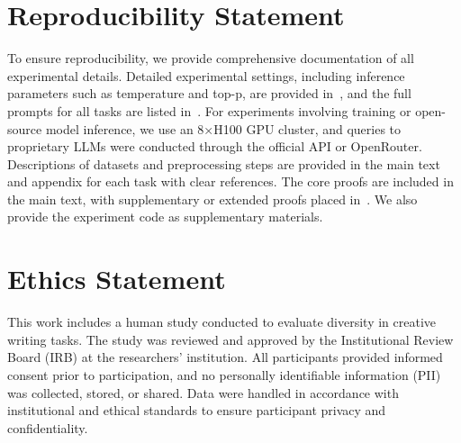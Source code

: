 
\newpage
\section*{Reproducibility Statement}
To ensure reproducibility, we provide comprehensive documentation of all experimental details.
Detailed experimental settings, including inference parameters such as temperature and top-p, are provided in~, and the full prompts for all tasks are listed in~. For experiments involving training or open-source model inference, we use an 8×H100 GPU cluster, and queries to proprietary LLMs were conducted through the official API or OpenRouter. 
Descriptions of datasets and preprocessing steps are provided in the main text and appendix for each task with clear references. 
The core proofs are included in the main text, with supplementary or extended proofs placed in~.
We also provide the experiment code as supplementary materials. 

\section*{Ethics Statement}
This work includes a human study conducted to evaluate diversity in creative writing tasks. The study was reviewed and approved by the Institutional Review Board (IRB) at the researchers' institution. All participants provided informed consent prior to participation, and no personally identifiable information (PII) was collected, stored, or shared. Data were handled in accordance with institutional and ethical standards to ensure participant privacy and confidentiality.



